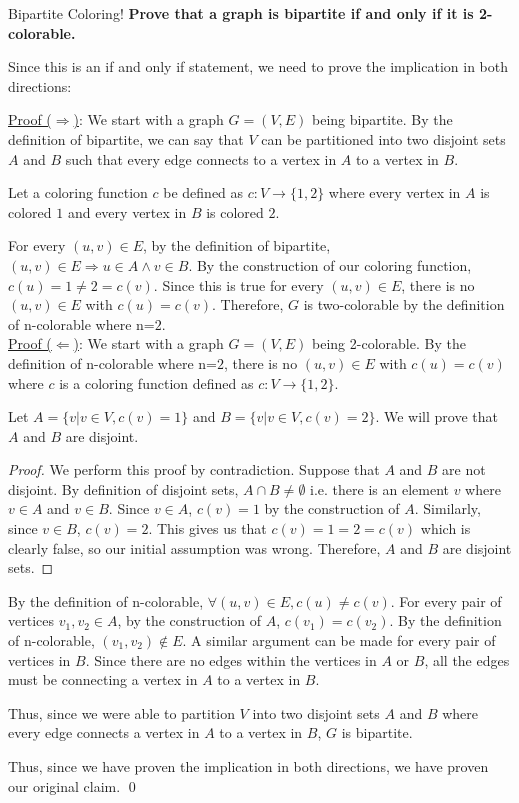 \documentclass[11pt, nopagenumbers]{adamblan-hw}
\begin{document}
\begin{question}{Bipartite Coloring!}
\textbf{Prove that a graph is bipartite if and only if it is 2-colorable.}

Since this is an if and only if statement, we need to prove the implication in both directions:

\underline{Proof ($\Rightarrow$)}:
We start with a graph $G = (V, E)$ being bipartite. By the definition of bipartite, we can say
that $V$ can be partitioned into two disjoint sets $A$ and $B$ such that every edge connects
to a vertex in $A$ to a vertex in $B$.

Let a coloring function $c$ be defined as $c: V \rightarrow \{1, 2\}$ where every vertex in $A$
is colored $1$ and every vertex in $B$ is colored $2$. 

For every $(u, v) \in E$, by the definition of bipartite, 
$(u, v) \in E \Rightarrow u \in A \land v \in B$. By the construction of our coloring function,
$c(u) = 1 \neq 2 = c(v)$. Since this is true for every $(u, v) \in E$, there is
no $(u, v) \in E$ with $c(u) = c(v)$. Therefore, $G$ is two-colorable by the definition of n-colorable where n=$2$. \\

\underline{Proof ($\Leftarrow$)}:
We start with a graph $G = (V, E)$ being 2-colorable. By the definition of n-colorable where n=$2$,
there is no $(u, v) \in E$ with $c(u) = c(v)$ where $c$ is a coloring function defined as
$c: V \rightarrow \{1, 2\}$. 

Let $A = \{v|v \in V, c(v) = 1\}$ and $B = \{v|v \in V, c(v) = 2\}$. We will prove that $A$ and $B$ are disjoint. 

\begin{proof} 
We perform this proof by contradiction. Suppose that $A$ and $B$ are not disjoint. By definition of disjoint sets,
$A \cap B \neq \emptyset$ i.e. there is an element $v$ where $v \in A$ and $v \in B$. Since 
$v \in A$, $c(v) = 1$ by the construction of $A$. Similarly, since $v \in B$, $c(v) = 2$. This
gives us that $c(v) = 1 = 2 = c(v)$ which is clearly false, so our initial assumption was wrong. 
Therefore, $A$ and $B$ are disjoint sets.
\end{proof}

By the definition of n-colorable, $\forall (u, v) \in E, c(u) \neq c(v)$. For every pair of vertices
$v_1, v_2 \in A$, by the construction of $A$, $c(v_1) = c(v_2)$. By the definition
of n-colorable, $(v_1, v_2) \notin E$. A similar argument can be made for every pair of vertices in $B$. Since
there are no edges within the vertices in $A$ or $B$, all the edges must be connecting a vertex
in $A$ to a vertex in $B$.

Thus, since we were able to partition $V$ into two disjoint sets $A$ and $B$ where every edge
connects a vertex in $A$ to a vertex in $B$, $G$ is bipartite. 

Thus, since we have proven the implication in both directions, we have proven our original
claim. \qed
\end{question}
\end{document}
